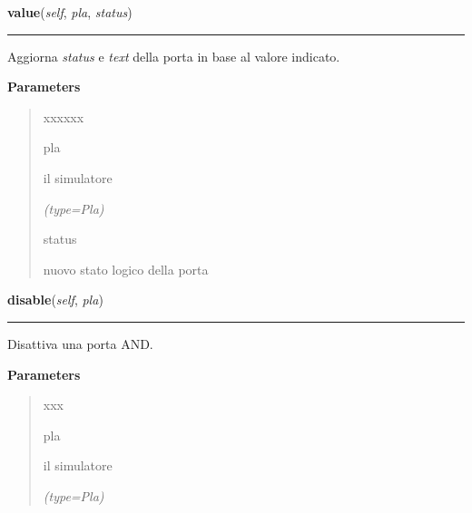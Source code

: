\hspace{.8\funcindent}\begin{boxedminipage}{\funcwidth}

    \raggedright \textbf{value}(\textit{self}, \textit{pla}, \textit{status})

    \vspace{-1.5ex}

    \rule{\textwidth}{0.5\fboxrule}
\setlength{\parskip}{2ex}
    Aggiorna \textit{status} e \textit{text} della porta in base al valore 
    indicato.

\setlength{\parskip}{1ex}
      \textbf{Parameters}
      \vspace{-1ex}

      \begin{quote}
        \begin{Ventry}{xxxxxx}

          \item[pla]

          il simulatore

            {\it (type=Pla)}

          \item[status]

          nuovo stato logico della porta

        \end{Ventry}

      \end{quote}

    \end{boxedminipage}

    \label{component:And:disable}

    \vspace{0.5ex}

\hspace{.8\funcindent}\begin{boxedminipage}{\funcwidth}

    \raggedright \textbf{disable}(\textit{self}, \textit{pla})

    \vspace{-1.5ex}

    \rule{\textwidth}{0.5\fboxrule}
\setlength{\parskip}{2ex}
    Disattiva una porta AND.

\setlength{\parskip}{1ex}
      \textbf{Parameters}
      \vspace{-1ex}

      \begin{quote}
        \begin{Ventry}{xxx}

          \item[pla]

          il simulatore

            {\it (type=Pla)}

        \end{Ventry}

      \end{quote}

    \end{boxedminipage}

